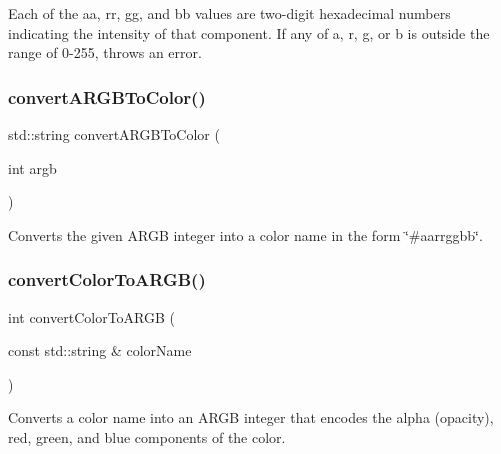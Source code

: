 Each of the {\ttfamily aa}, {\ttfamily rr}, {\ttfamily gg}, and {\ttfamily bb} values are two-\/digit hexadecimal numbers indicating the intensity of that component. If any of a, r, g, or b is outside the range of 0-\/255, throws an error. \mbox{\label{classsgl_1_1GColor_aba032cfdc6b7936c6b828f8dfc2a9a90}} 
\subsubsection{\texorpdfstring{convert\+A\+R\+G\+B\+To\+Color()}{convertARGBToColor()}\hspace{0.1cm}{\footnotesize\ttfamily [2/2]}}
{\footnotesize\ttfamily std\+::string convert\+A\+R\+G\+B\+To\+Color (\begin{DoxyParamCaption}\item[{int}]{argb }\end{DoxyParamCaption})\hspace{0.3cm}{\ttfamily [static]}}



Converts the given A\+R\+GB integer into a color name in the form {\ttfamily \char`\"{}\#aarrggbb\char`\"{}}. 

\mbox{\label{classsgl_1_1GColor_a5efa1612c4ccfff89eca4ed3cfd0206d}} 
\subsubsection{\texorpdfstring{convert\+Color\+To\+A\+R\+G\+B()}{convertColorToARGB()}}
{\footnotesize\ttfamily int convert\+Color\+To\+A\+R\+GB (\begin{DoxyParamCaption}\item[{const std\+::string \&}]{color\+Name }\end{DoxyParamCaption})\hspace{0.3cm}{\ttfamily [static]}}



Converts a color name into an A\+R\+GB integer that encodes the alpha (opacity), red, green, and blue components of the color. 

